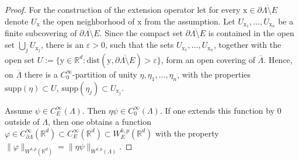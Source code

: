 \documentclass[10pt,leqno]{amsart}
\theoremstyle{definition}
\numberwithin{equation}{section}
\begin{document}
\begin{proof}
 For the construction of the extension operator let for every ${{\mathrm x}} \in
 \overline{\partial \Lambda \setminus E}$ denote
 $U_{{\mathrm x}}$ the open neighborhood of ${{\mathrm x}}$ from the assumption.
 Let $U_{{{\mathrm x}}_1}, \ldots, U_{{{\mathrm x}}_n}$ be a finite subcovering of 
 $\overline{\partial \Lambda \setminus E}$. Since the compact set
 $\overline{\partial \Lambda \setminus E}$ is contained in the open set
 $\bigcup_j U_{{{\mathrm x}}_j}$, there is an ${\varepsilon} > 0$, such that the sets
 $U_{{{\mathrm x}}_1},\ldots,U_{{{\mathrm x}}_n}$, together with the open set $U :=
 \{\mathrm y \in {{\mathbb R}}^d : \mathrm{dist}(\mathrm y, \overline{\partial \Lambda
 \setminus E}) > {\varepsilon} \}$, form an open covering of $\overline \Lambda$.
 Hence, on $\overline \Lambda$ there is a $C_0^\infty$-partition of unity $\eta,
 \eta_1, \ldots, \eta_n$, with the properties $\mathrm{supp}(\eta) \subset U$,
 $\mathrm{supp}(\eta_j) \subset U_{{{\mathrm x}}_j}$.

 Assume $\psi \in C^\infty_E(\Lambda)$. Then $\eta \psi \in
 C^\infty_0(\Lambda)$. If one extends this function by $0$ outside of $\Lambda$,
 then one obtains a function $\varphi \in
 C^\infty_{\partial \Lambda}({{\mathbb R}}^d) \subset C^\infty_E({{\mathbb R}}^d) \subset
 W^{k,p}_E({{\mathbb R}}^d)$ with the property $\|\varphi\|_{W^{k,p}({{\mathbb R}}^d)} =
 \|\eta \psi\|_{W^{k,p}(\Lambda)}$.


\end{proof}
\end{document}

